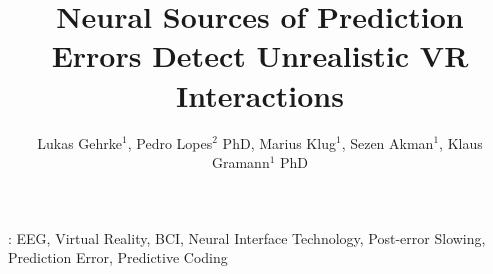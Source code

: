 \documentclass[12pt]{iopart}
\begin{document}
\title[Neural Sources Detect Unrealistic VR Interactions]{Neural Sources of Prediction Errors Detect Unrealistic VR Interactions}


\author{Lukas Gehrke$^1$, Pedro Lopes$^2$ PhD, Marius Klug$^1$, Sezen Akman$^1$, Klaus Gramann$^{1}$ PhD}
\address{$^1$Biological Psychology and Neuroergonomics, Department of Psychology and Ergonomics, TU Berlin, Germany}
\address{$^2$University of Chicago, USA}







%
\vspace{2pc}
: EEG, Virtual Reality, BCI, Neural Interface Technology, Post-error Slowing, Prediction Error, Predictive Coding
%
\submitto{\JNE}
%
% 
%
\end{document}
